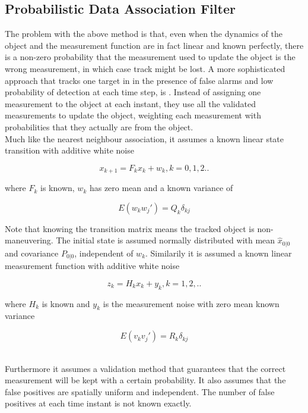 \subsection{Probabilistic Data Association Filter}

The problem with the above method is that, even when the dynamics of the object and the measurement function are in fact linear and known perfectly, there is a non-zero probability that the measurement used to update the object is the wrong measurement, in which case track might be lost. A more sophisticated approach that tracks one target in in the presence of false alarms and low probability of detection at each time step, is \cite{BarShalomPDA}. Instead of assigning one measurement to the object at each instant, they use all the validated measurements to update the object, weighting each measurement with probabilities that they actually are from the object.  \\

Much like the nearest neighbour association, it assumes a known linear state transition with additive white noise

\begin{equation}
    x_{k+1} = F_kx_k + w_k, k=0,1,2..
\end{equation}

where $F_k$ is known, $w_k$ has zero mean and a known variance of 

\begin{equation}
    E(w_kw_j') = Q_k\delta_{kj}
\end{equation}

Note that knowing the transition matrix means the tracked object is non-maneuvering. The initial state is assumed normally distributed with mean $\hat{x}_{0|0}$ and covariance $P_{0|0}$, independent of $w_k$. Similarily it is assumed a known linear measurement function with additive white noise

\begin{equation}
    z_k = H_kx_k + y_k, k = 1,2,..
\end{equation}

where $H_k$ is known and $y_k$ is the measurement noise with zero mean known variance 

\begin{equation}
    E(v_kv_j') = R_k\delta_{kj}
\end{equation}

\\

Furthermore it assumes a validation method that guarantees that the correct measurement will be kept with a certain probability. It also assumes that the false positives are spatially uniform and independent. The number of false positives at each time instant is not known exactly.   \\ 

